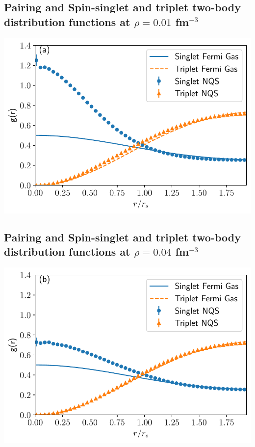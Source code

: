 \documentclass[%
oneside,                 %
final,                   %
10pt]{article}
\begin{document}
\subsection{Pairing and Spin-singlet and triplet two-body distribution functions at $\rho=0.01$ fm$^{-3}$}
\begin{block}{}

\vspace{6mm}

\centerline{\includegraphics[width=0.9\linewidth]{figures/01_tbd.pdf}}

\vspace{6mm}

\end{block}

\subsection{Pairing and Spin-singlet and triplet two-body distribution functions at $\rho=0.04$ fm$^{-3}$}

\begin{block}{}

\vspace{6mm}

\centerline{\includegraphics[width=0.9\linewidth]{figures/04_tbd.pdf}}

\vspace{6mm}

\end{block}
\end{document}
